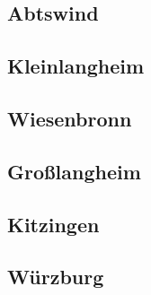 \documentclass[fontsize=12pt,a4paper]{scrreprt}
\begin{document}
            \subsection{Abtswind}
            

            \subsection{Kleinlangheim}
            

            \subsection{Wiesenbronn}
            

            \subsection{Großlangheim}
            

            \subsection{Kitzingen}
            

            \subsection{Würzburg}
            
\end{document}
